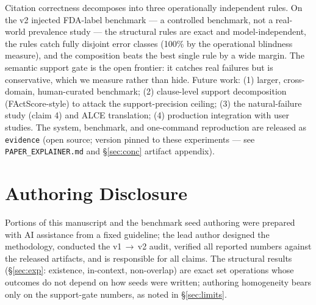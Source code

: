Citation correctness decomposes into three operationally independent
rules. On the v2 injected FDA-label benchmark --- a controlled
benchmark, not a real-world prevalence study --- the structural rules
are exact and model-independent, the rules catch fully disjoint error
classes (100\% by the operational blindness measure), and the
composition beats the best single rule by a wide margin. The semantic
support gate is the open frontier: it catches real failures but is
conservative, which we measure rather than hide.
Future work:
(1) larger, cross-domain, human-curated benchmark;
(2) clause-level support decomposition (FActScore-style) to attack the
support-precision ceiling;
(3) the natural-failure study (claim 4) and ALCE translation;
(4) production integration with user studies.
The system, benchmark, and one-command reproduction are released as
\texttt{evidence} (open source; version pinned to these experiments
--- see \texttt{PAPER\_EXPLAINER.md} and \S\ref{sec:conc} artifact
appendix).

\section*{Authoring Disclosure}

Portions of this manuscript and the benchmark seed authoring were
prepared with AI assistance from a fixed guideline; the lead author
designed the methodology, conducted the v1\,$\to$\,v2 audit, verified
all reported numbers against the released artifacts, and is
responsible for all claims. The structural results
(\S\ref{sec:exp}: existence, in-context, non-overlap) are exact set
operations whose outcomes do not depend on how seeds were written;
authoring homogeneity bears only on the support-gate numbers, as noted
in \S\ref{sec:limits}.

